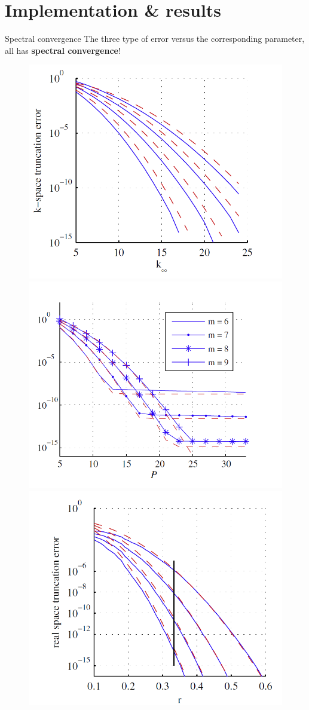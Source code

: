 \documentclass{beamer}
\begin{document}
\section{Implementation \& results}

\begin{frame}{Spectral convergence}
The three type of error versus the corresponding parameter, \\
all has \textbf{spectral convergence}!
\begin{figure}[H]\centering
	\includegraphics[width=.36\textwidth]{freq_error_vs_k}
	\includegraphics[width=.36\textwidth]{qudrature_error_vs_P}
	\includegraphics[width=.36\textwidth]{real_error_vs_r}
\end{figure}
\end{frame}
\end{document}

